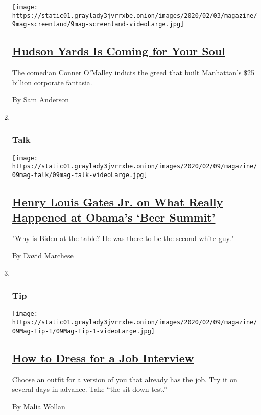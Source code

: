 \begin{enumerate}
  \texttt{[image: https://static01.graylady3jvrrxbe.onion/images/2020/02/03/magazine/9mag-screenland/9mag-screenland-videoLarge.jpg]}

  \hypertarget{hudson-yards-is-coming-for-your-soul}{%
  \subsection{\texorpdfstring{\href{/2020/02/06/magazine/unlock-your-ultimate-consumerist-self-in-hudson-yards-video-game.html}{Hudson
  Yards Is Coming for Your
  Soul}}{Hudson Yards Is Coming for Your Soul}}\label{hudson-yards-is-coming-for-your-soul}}

  The comedian Conner O'Malley indicts the greed that built Manhattan's
  \$25 billion corporate fantasia.

  By Sam Anderson
\item ~
  \hypertarget{talk}{%
  \subsubsection{Talk}\label{talk}}

  \texttt{[image: https://static01.graylady3jvrrxbe.onion/images/2020/02/09/magazine/09mag-talk/09mag-talk-videoLarge.jpg]}

  \hypertarget{henry-louis-gates-jr-on-what-really-happened-at-obamas-beer-summit}{%
  \subsection{\texorpdfstring{\href{/interactive/2020/02/03/magazine/henry-louis-gates-jr-interview.html}{Henry
  Louis Gates Jr. on What Really Happened at Obama's `Beer
  Summit'}}{Henry Louis Gates Jr. on What Really Happened at Obama's `Beer Summit'}}\label{henry-louis-gates-jr-on-what-really-happened-at-obamas-beer-summit}}

  "Why is Biden at the table? He was there to be the second white guy."

  By David Marchese
\item ~
  \hypertarget{tip}{%
  \subsubsection{Tip}\label{tip}}

  \texttt{[image: https://static01.graylady3jvrrxbe.onion/images/2020/02/09/magazine/09Mag-Tip-1/09Mag-Tip-1-videoLarge.jpg]}

  \hypertarget{how-to-dress-for-a-job-interview}{%
  \subsection{\texorpdfstring{\href{/2020/02/04/magazine/how-to-dress-for-a-job-interview.html}{How
  to Dress for a Job
  Interview}}{How to Dress for a Job Interview}}\label{how-to-dress-for-a-job-interview}}

  Choose an outfit for a version of you that already has the job. Try it
  on several days in advance. Take ``the sit-down test.''

  By Malia Wollan
\end{enumerate}

